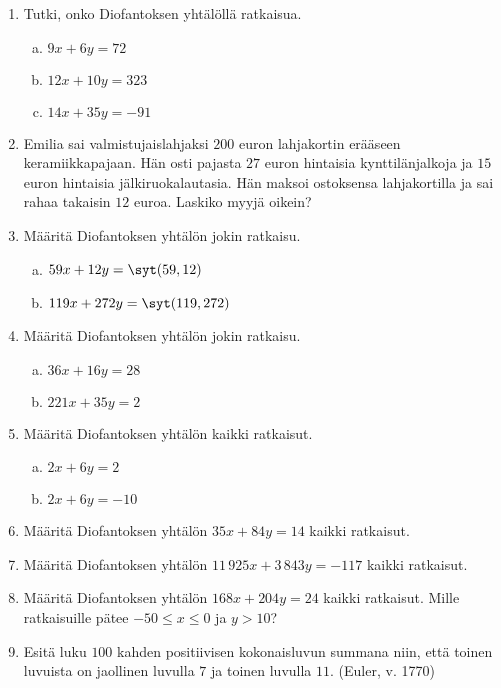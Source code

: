 \begin{enumerate}

\item Tutki, onko Diofantoksen yhtälöllä ratkaisua.
\begin{enumerate}[a)]
\item $9x + 6y = 72$
\item $12x + 10y = 323$
\item $14x + 35y = -91$
\end{enumerate}

\item Emilia sai valmistujaislahjaksi $200$ euron lahjakortin erääseen keramiikkapajaan. Hän osti pajasta $27$ euron hintaisia kynttilänjalkoja ja $15$ euron hintaisia jälkiruokalautasia. Hän maksoi ostoksensa lahjakortilla ja sai rahaa takaisin $12$ euroa. Laskiko myyjä oikein?

\item Määritä Diofantoksen yhtälön jokin ratkaisu.
\begin{enumerate}[a)]
\item $59x + 12y = \syt(59,12)$
\item $119x + 272y = \syt(119,272)$
\end{enumerate}

\item Määritä Diofantoksen yhtälön jokin ratkaisu.
\begin{enumerate}[a)]
\item $36x + 16y = 28$
\item $221x + 35y = 2$
\end{enumerate}

\item Määritä Diofantoksen yhtälön kaikki ratkaisut.
\begin{enumerate}[a)]
\item $2x + 6y = 2$
\item $2x + 6y = -10$
\end{enumerate}

\item Määritä Diofantoksen yhtälön $35x + 84y = 14$ kaikki ratkaisut.

\item Määritä Diofantoksen yhtälön $11\, 925x + 3\, 843y = -117$ kaikki ratkaisut.

\item Määritä Diofantoksen yhtälön $168x + 204y = 24$ kaikki ratkaisut. Mille ratkaisuille pätee $-50 \le x \le 0$ ja $y > 10$?

\item  Esitä luku $100$ kahden positiivisen kokonaisluvun summana niin, että toinen luvuista on jaollinen luvulla $7$ ja toinen luvulla $11$. (Euler, v. 1770)


\end{enumerate}
